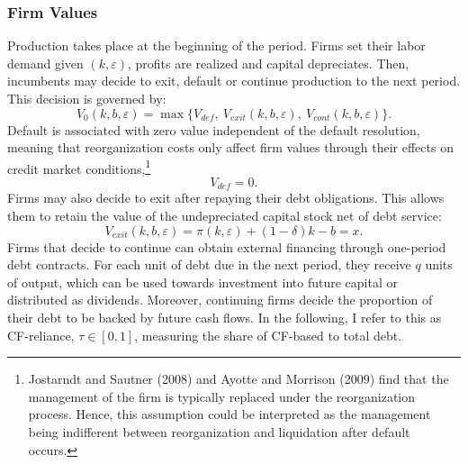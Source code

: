 \documentclass[12pt]{article}
\begin{document}
\subsubsection{Firm Values} \label{sec:Firm Values}
Production takes place at the beginning of the period. Firms set their labor demand given $(k,\varepsilon)$, profits are realized and capital depreciates. Then, incumbents may decide to exit, default or continue production to the next period. This decision is governed by: 
\begin{equation} \label{eq:default decision}
 V_0(k,b,\varepsilon) = \max \{V_{def}, \  V_{exit}(k,b,\varepsilon), \ V_{cont}(k,b,\varepsilon) \}.
\end{equation}
Default is associated with zero value independent of the default resolution, meaning that reorganization costs only affect firm values through their effects on credit market conditions,\footnote{Jostarndt and Sautner (2008) and Ayotte and Morrison (2009) find that the management of the firm is typically replaced under the reorganization process. Hence, this assumption could be interpreted as the management being indifferent between reorganization and liquidation after default occurs.} 
\begin{equation}
 V_{def} = 0.
\end{equation}
Firms may also decide to exit after repaying their debt obligations. This allows them to retain the value of the undepreciated capital stock net of debt service: 
\begin{equation}
    V_{exit}(k, b, \varepsilon) = \pi(k,\varepsilon) + (1-\delta)k - b  = x.
\end{equation}
Firms that decide to continue can obtain external financing through one-period debt contracts. For each unit of debt due in the next period, they receive $q$ units of output, which can be used towards investment into future capital or distributed as dividends. Moreover, continuing firms decide the proportion of their debt to be backed by future cash flows. In the following, I refer to this as CF-reliance, $\tau \in [0,1]$, measuring the share of CF-based to total debt. 
\end{document}
